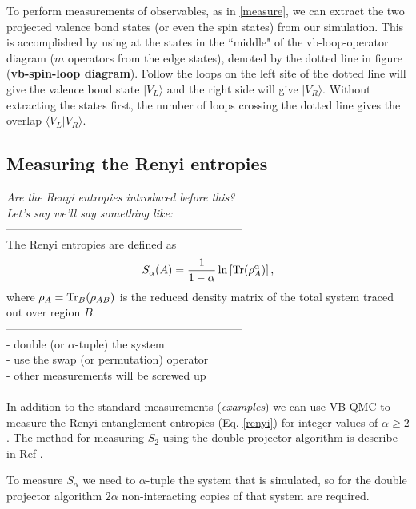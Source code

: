 \documentclass[prb,aps,twocolumn,floatfix,amsmath,amssymb,superscriptaddress,tightenlines]{revtex4}
\begin{document}
To perform measurements of observables, as in \eqref{measure}, we can extract the two projected valence bond states (or even the spin states) from our simulation.  
This  is accomplished by using at the states in the ``middle" of the vb-loop-operator diagram ($m$ operators from the edge states), denoted by the dotted line in figure ({\bf \!vb-spin-loop diagram}).
Follow the loops on the left site of the dotted line will give the valence bond state $\lvert V_L \rangle$ and the right side will give $\lvert V_R \rangle$.
Without extracting the states first, the number of loops crossing the dotted line gives the overlap $\langle V_L \lvert V_R \rangle $.

\subsection{Measuring the Renyi entropies}
{\it Are the Renyi entropies introduced before this?}\\ 
{\it Let's say we'll say something like:}\\
---------------------------------------------------------------\\
The Renyi entropies are defined as 
\begin{equation} \label{renyi}
S_{\alpha}(A) = \frac{1}{1-\alpha}\ln \left[ {\rm Tr}(\rho_A^{\alpha}) \right],
\end{equation}
where $\rho_A = {\rm Tr}_B (\rho_{AB})$ is the reduced density matrix of the total system traced out over region $B$.\\
---------------------------------------------------------------\\
\noindent
- {double (or $\alpha$-tuple) the system}\\
- {use the swap (or permutation) operator}\\
- {other measurements will be screwed up} \\
---------------------------------------------------------------\\


In addition to the standard measurements ({\it examples}) we can use VB QMC to measure the Renyi entanglement entropies (Eq. \eqref{renyi}) for integer values of $\alpha \ge 2$.  
The method for measuring $S_2$ using the double projector algorithm is describe in Ref \cite{our paper}.

To measure $S_{\alpha}$ we need to $\alpha$-tuple the system that is simulated,
so for the double projector algorithm $2\alpha$ non-interacting copies of that system are required.  
\end{document}
